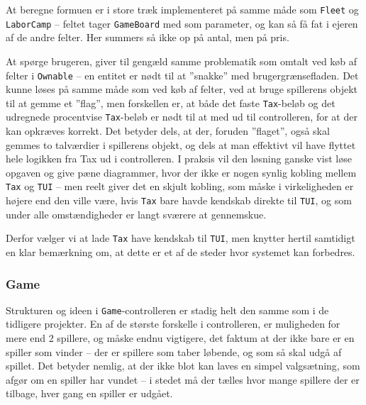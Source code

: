 At beregne formuen er i store træk implementeret på samme måde som \texttt{Fleet} og \texttt{LaborCamp} – feltet tager \texttt{GameBoard} med som parameter, og kan så få fat i ejeren af de andre felter. Her summers så ikke op på antal, men på pris.


At spørge brugeren, giver til gengæld samme problematik som omtalt ved køb af felter i \texttt{Ownable} – en entitet er nødt til at ”snakke” med brugergrænsefladen. Det kunne løses på samme måde som ved køb af felter, ved at bruge spillerens objekt til at gemme et ”flag”, men forskellen er, at både det faste \texttt{Tax}-beløb og det udregnede procentvise \texttt{Tax}-beløb er nødt til at med ud til controlleren, for at der kan opkræves korrekt. Det betyder dels, at der, foruden ”flaget”, også skal gemmes to talværdier i spillerens objekt, og dels at man effektivt vil have flyttet hele logikken fra Tax ud i controlleren.
I praksis vil den løsning ganske vist løse opgaven og give pæne diagrammer, hvor der ikke er nogen synlig kobling mellem \texttt{Tax} og \texttt{TUI} – men reelt giver det en skjult kobling, som måske i virkeligheden er højere end den ville være, hvis \texttt{Tax} bare havde kendskab direkte til \texttt{TUI}, og som under alle omstændigheder er langt sværere at gennemskue.


Derfor vælger vi at lade \texttt{Tax} have kendskab til \texttt{TUI}, men knytter hertil samtidigt en klar bemærkning om, at dette er et af de steder hvor systemet kan forbedres.
\subsubsection{Game}
Strukturen og ideen i \texttt{Game}-controlleren er stadig helt den samme som i de tidligere projekter. En af de største forskelle i controlleren, er muligheden for mere end 2 spillere, og måske endnu vigtigere, det faktum at der ikke bare er en spiller som vinder – der er spillere som taber løbende, og som så skal udgå af spillet. Det betyder nemlig, at der ikke blot kan laves en simpel valgsætning, som afgør om en spiller har vundet – i stedet må der tælles hvor mange spillere der er tilbage, hver gang en spiller er udgået.
\newpage